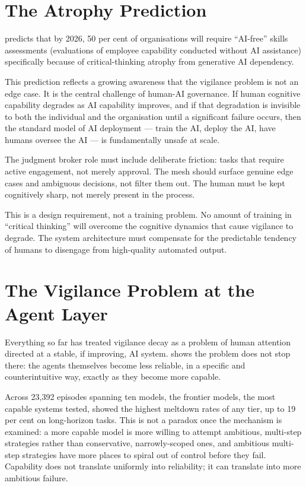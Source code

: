 \section{The Atrophy Prediction}

\textcite{Gartner2025} predicts that by 2026, 50 per cent of organisations will require ``AI-free'' skills assessments (evaluations of employee capability conducted without AI assistance) specifically because of critical-thinking atrophy from generative AI dependency.

This prediction reflects a growing awareness that the vigilance problem is not an edge case. It is the central challenge of human-AI governance. If human cognitive capability degrades as AI capability improves, and if that degradation is invisible to both the individual and the organisation until a significant failure occurs, then the standard model of AI deployment --- train the AI, deploy the AI, have humans oversee the AI --- is fundamentally unsafe at scale.

\begin{cautionbox}[title={Design Implication for the Agentic Mesh}]
The judgment broker role must include deliberate friction: tasks that require active engagement, not merely approval. The mesh should surface genuine edge cases and ambiguous decisions, not filter them out. The human must be kept cognitively sharp, not merely present in the process.

This is a design requirement, not a training problem. No amount of training in ``critical thinking'' will overcome the cognitive dynamics that cause vigilance to degrade. The system architecture must compensate for the predictable tendency of humans to disengage from high-quality automated output.
\end{cautionbox}

\section{The Vigilance Problem at the Agent Layer}

Everything so far has treated vigilance decay as a problem of human attention directed at a stable, if improving, AI system. \parencite{Khanal2026} shows the problem does not stop there: the agents themselves become less reliable, in a specific and counterintuitive way, exactly as they become more capable.

Across 23,392 episodes spanning ten models, the frontier models, the most capable systems tested, showed the highest meltdown rates of any tier, up to 19 per cent on long-horizon tasks. This is not a paradox once the mechanism is examined: a more capable model is more willing to attempt ambitious, multi-step strategies rather than conservative, narrowly-scoped ones, and ambitious multi-step strategies have more places to spiral out of control before they fail. Capability does not translate uniformly into reliability; it can translate into more ambitious failure.

